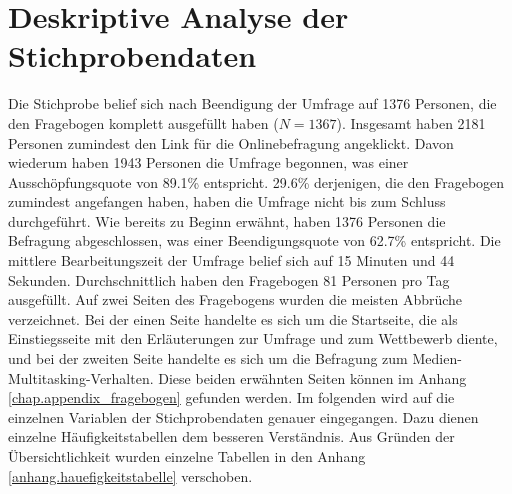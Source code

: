 \section{Deskriptive Analyse der Stichprobendaten}
\label{label.stichprobe}
Die Stichprobe belief sich nach Beendigung der Umfrage auf 1376 Personen, die den Fragebogen komplett ausgefüllt haben ($N = 1367$). Insgesamt haben 2181 Personen zumindest den Link für die Onlinebefragung angeklickt. Davon wiederum haben 1943 Personen die Umfrage begonnen, was einer Ausschöpfungsquote von 89.1\% entspricht. 29.6\% derjenigen, die den Fragebogen zumindest angefangen haben, haben die Umfrage nicht bis zum Schluss durchgeführt. Wie bereits zu Beginn erwähnt, haben 1376 Personen die Befragung abgeschlossen, was einer Beendigungsquote von 62.7\% entspricht. Die mittlere Bearbeitungszeit der Umfrage belief sich auf 15 Minuten und 44 Sekunden. Durchschnittlich haben den Fragebogen 81 Personen pro Tag ausgefüllt. Auf zwei Seiten des Fragebogens wurden die meisten Abbrüche verzeichnet. Bei der einen Seite handelte es sich um die Startseite, die als Einstiegsseite mit den Erläuterungen zur Umfrage und zum Wettbewerb diente, und bei der zweiten Seite handelte es sich um die Befragung zum Medien-Multitasking-Verhalten. Diese beiden erwähnten Seiten können im Anhang \ref{chap.appendix_fragebogen} gefunden werden. Im folgenden wird auf die einzelnen Variablen der Stichprobendaten genauer eingegangen. Dazu dienen einzelne Häufigkeitstabellen dem besseren Verständnis. Aus Gründen der Übersichtlichkeit wurden einzelne Tabellen in den Anhang \ref{anhang.hauefigkeitstabelle} verschoben.

